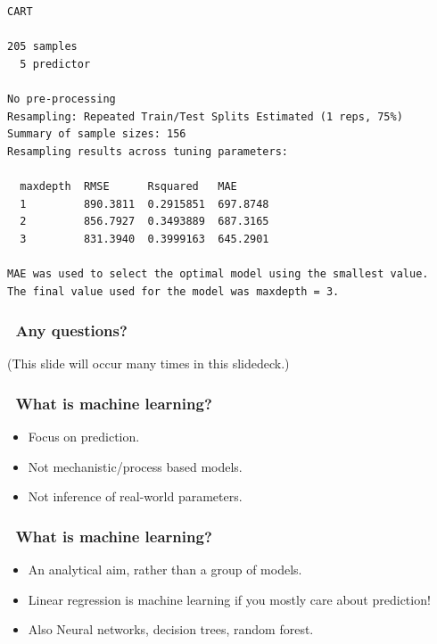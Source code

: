 \documentclass[handout, aspectratio = 169]{beamer}
\begin{document}
\begin{frame}[fragile]

\small
\begin{Verbatim}
CART 

205 samples
  5 predictor

No pre-processing
Resampling: Repeated Train/Test Splits Estimated (1 reps, 75%) 
Summary of sample sizes: 156 
Resampling results across tuning parameters:

  maxdepth  RMSE      Rsquared   MAE     
  1         890.3811  0.2915851  697.8748
  2         856.7927  0.3493889  687.3165
  3         831.3940  0.3999163  645.2901

MAE was used to select the optimal model using the smallest value.
The final value used for the model was maxdepth = 3.

\end{Verbatim}

\end{frame} 





\begin{frame}
\frametitle{\insertframenumber~Any questions?}

(This slide will occur many times in this slidedeck.)

\end{frame} 












\begin{frame}
\frametitle{\insertframenumber~What is machine learning?}
\begin{itemize}
\item Focus on prediction.
\item Not mechanistic/process based models.
\item Not inference of real-world parameters.
\end{itemize}
\end{frame} 







\begin{frame}
\frametitle{\insertframenumber~What is machine learning?}

\begin{itemize}
\item An analytical aim, rather than a group of models.
\item Linear regression is machine learning if you mostly care about prediction!
\item Also Neural networks, decision trees, random forest.
\end{itemize}

\end{frame} 
\end{document}
